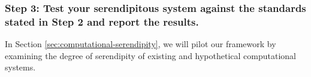 \subsubsection*{Step 3: Test your serendipitous system against the standards stated in Step 2 and report the results.}

\noindent In Section \ref{sec:computational-serendipity}, we will pilot our framework by examining the degree of serendipity of existing and hypothetical computational systems. 

